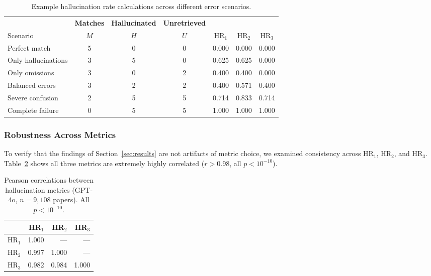 \documentclass[11pt]{article}
\begin{document}
\begin{table}[t]
\centering

\begin{tabular}{@{}lcccccc@{}}
\toprule
 & \textbf{Matches} & \textbf{Hallucinated} & \textbf{Unretrieved} & & & \\
Scenario & $M$ & $H$ & $U$ & HR$_1$ & HR$_2$ & HR$_3$ \\
\midrule
Perfect match & 5 & 0 & 0 & 0.000 & 0.000 & 0.000 \\
Only hallucinations & 3 & 5 & 0 & 0.625 & 0.625 & 0.000 \\
Only omissions & 3 & 0 & 2 & 0.400 & 0.400 & 0.000 \\
Balanced errors & 3 & 2 & 2 & 0.400 & 0.571 & 0.400 \\
Severe confusion & 2 & 5 & 5 & 0.714 & 0.833 & 0.714 \\
Complete failure & 0 & 5 & 5 & 1.000 & 1.000 & 1.000 \\
\bottomrule
\end{tabular}
\caption{Example hallucination rate calculations across different error scenarios.}
\label{tab:hr_example}
\end{table}

\subsubsection{Robustness Across Metrics}
\label{sec:robustness}

To verify that the findings of Section~\ref{sec:results} are not artifacts of metric choice, we examined consistency across HR$_1$, HR$_2$, and HR$_3$. Table~\ref{tab:metric_correlations} shows all three metrics are extremely highly correlated ($r > 0.98$, all $p < 10^{-10}$).

\begin{table}[htbp]
  \centering

  \begin{tabular}{@{}lrrr@{}}
    \toprule
    & \textbf{HR}$_1$ & \textbf{HR}$_2$ & \textbf{HR}$_3$ \\
    \midrule
    HR$_1$ & 1.000 & — & — \\
    HR$_2$ & 0.997 & 1.000 & — \\
    HR$_3$ & 0.982 & 0.984 & 1.000 \\
    \bottomrule
  \end{tabular}
    \caption{Pearson correlations between hallucination metrics (GPT-4o, $n = 9{,}108$ papers). All $p < 10^{-10}$.}
  \label{tab:metric_correlations}
\end{table}
\end{document}

